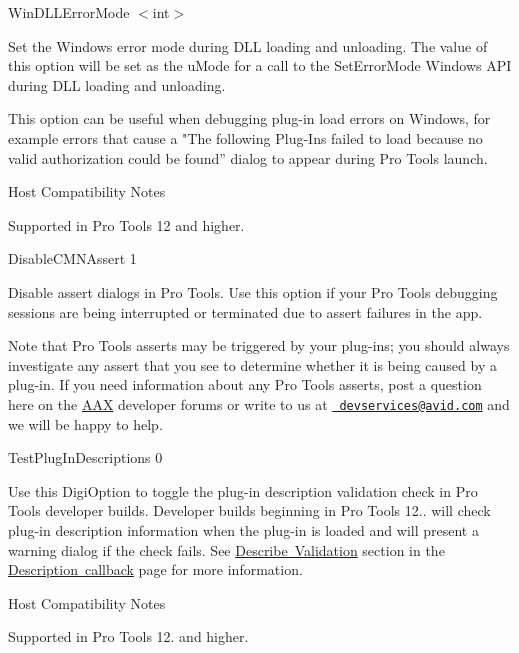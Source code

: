 \begin{DoxyItemize}
\item  {\ttfamily Win\+D\+L\+L\+Error\+Mode $<$int$>$}

Set the Windows error mode during D\+LL loading and unloading. The value of this option will be set as the {\ttfamily u\+Mode} for a call to the {\ttfamily Set\+Error\+Mode} Windows A\+PI during D\+LL loading and unloading.

This option can be useful when debugging plug-\/in load errors on Windows, for example errors that cause a "The following Plug-\/\+Ins failed to load because no valid authorization could be found” dialog to appear during Pro Tools launch.

\begin{DoxyRefDesc}{Host Compatibility Notes}
\item[\mbox{\hyperlink{a00786__compatibility_notes000018}{Host Compatibility Notes}}]Supported in Pro Tools 12 and higher.\end{DoxyRefDesc}





\item  {\ttfamily Disable\+C\+M\+N\+Assert 1}

Disable assert dialogs in Pro Tools. Use this option if your Pro Tools debugging sessions are being interrupted or terminated due to assert failures in the app.

Note that Pro Tools asserts may be triggered by your plug-\/ins; you should always investigate any assert that you see to determine whether it is being caused by a plug-\/in. If you need information about any Pro Tools asserts, post a question here on the \mbox{\hyperlink{a00852}{A\+AX}} developer forums or write to us at \href{mailto:devservices@avid.com}{\texttt{ devservices@avid.\+com}} and we will be happy to help. 


\item  {\ttfamily Test\+Plug\+In\+Descriptions 0}

Use this Digi\+Option to toggle the plug-\/in description validation check in Pro Tools developer builds. Developer builds beginning in Pro Tools 12.. will check plug-\/in description information when the plug-\/in is loaded and will present a warning dialog if the check fails. See \mbox{\hyperlink{a00796_describe_validation}{Describe Validation}} section in the \mbox{\hyperlink{a00796}{Description callback}} page for more information.

\begin{DoxyRefDesc}{Host Compatibility Notes}
\item[\mbox{\hyperlink{a00786__compatibility_notes000019}{Host Compatibility Notes}}]Supported in Pro Tools 12. and higher.\end{DoxyRefDesc}






\end{DoxyItemize}
